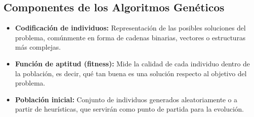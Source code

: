 \subsection{Componentes de los Algoritmos Genéticos}
\begin{itemize}
    \item \textbf{Codificación de individuos:} Representación de las posibles soluciones del problema,
        comúnmente en forma de cadenas binarias, vectores o estructuras más complejas.
    
    \item \textbf{Función de aptitud (fitness):} Mide la calidad de cada individuo dentro de la población,
        es decir, qué tan buena es una solución respecto al objetivo del problema.
    
    \item \textbf{Población inicial:} Conjunto de individuos generados aleatoriamente o a partir de
        heurísticas, que servirán como punto de partida para la evolución.
    

\end{itemize}
